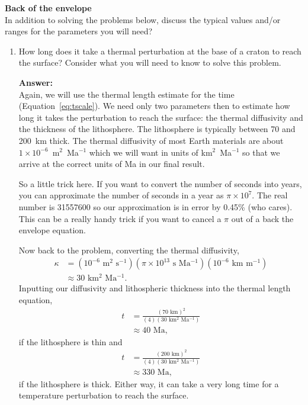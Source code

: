 {\bf Back of the envelope}\\
In addition to solving the problems below, discuss the typical values and/or
ranges for the parameters you will need?
\begin{enumerate}
    \item How long does it take a thermal perturbation at the base of a
    craton to reach the surface?  Consider what you will need to know to
    solve this problem.  
    
    {\bf Answer:} \\
    Again, we will use the thermal length estimate for the time
    (Equation~\ref{eq:tscale}).  We need only two parameters then to
    estimate how long it takes the perturbation to reach the surface: the
    thermal diffusivity and the thickness of the lithosphere.  The
    lithosphere is typically between 70 and 200~km thick.  The thermal
    diffusivity of most Earth materials are about $1 \times
    10^{-6}$~m$^{2}$~Ma$^{-1}$ which we will want in units of
    km$^{2}$~Ma$^{-1}$ so that we arrive at the correct units of Ma in our
    final result.
    
    So a little trick here.  If you want to convert the number of seconds
    into years, you can approximate the number of seconds in a year as $\pi
    \times 10^7$.  The real number is 31557600 so our approximation is in
    error by 0.45\% (who cares).  This can be a really handy trick if you
    want to cancel a $\pi$ out of a back the envelope equation.

    Now back to the problem, converting the thermal diffusivity,
    \begin{align*}
        \kappa &= (10^{-6} \text{ m$^{2}$ s$^{-1}$})(\pi \times
        10^{13}
        \text{ s Ma$^{-1}$})(10^{-6} \text{ km m$^{-1}$}) \\
        &\approx 30 \text{ km$^2$ Ma$^{-1}$} .
    \end{align*}
    Inputting our diffusivity and lithospheric thickness into the thermal
    length equation,
    \begin{align*}
        t &= \frac{(70\text{ km})^2}{(4) (30 \text{ km$^2$~Ma$^{-1}$})}\\
        &\approx 40 \text{ Ma},
    \end{align*}
    if the lithosphere is thin and 
    \begin{align*}
        t &= \frac{(200\text{ km})^2}{(4) (30 \text{ km$^2$~Ma$^{-1}$})}\\
        &\approx 330 \text{ Ma},
    \end{align*}
    if the lithosphere is thick.  Either way, it can take a very long time
    for a temperature perturbation to reach the surface.


\end{enumerate}
